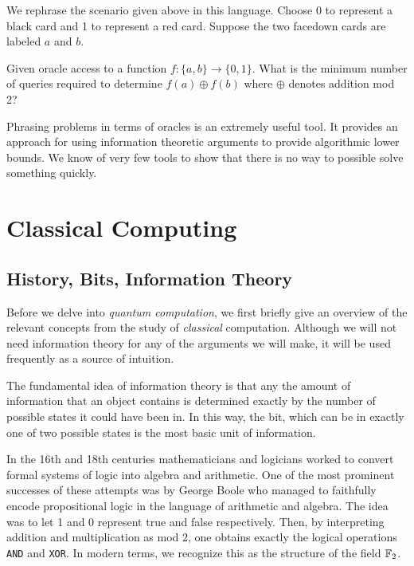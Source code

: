         We rephrase the scenario given above in this language.  Choose 0 to represent a black card and 1 to
        represent a red card. Suppose the two facedown cards are labeled $a$ and $b$.   
       
        \begin{example} 
            Given oracle access to a function $f: \{a, b\} \rightarrow \{0, 1\}$. What is the minimum number of
            queries required to determine $f(a) \oplus f(b)$ where $\oplus$ denotes addition mod 2?
        \end{example}

        

        Phrasing problems in terms of oracles is an extremely useful tool. It provides an approach for using 
        information theoretic arguments to provide algorithmic lower bounds. We know of very few tools to show that 
        there is no way to possible solve something quickly.

        \begin{example}
        \end{example}


        

\section{Classical Computing}
        \subsection{History, Bits, Information Theory}
        Before we delve into  \emph{quantum computation}, we first briefly give an overview of the relevant 
        concepts from the study of \emph{classical} computation. Although we will not need information theory for 
        any of the arguments we will make, it will be used frequently as a source of intuition.

        The fundamental idea of information theory is that any the amount of information that an object contains is 
        determined exactly by the number of possible states it could have been in. In this way, the bit, which can 
        be in exactly one of two possible states is the most basic unit of information.


        In the 16th and 18th centuries mathematicians and logicians worked to convert formal systems of logic into 
        algebra and arithmetic. One of the most prominent successes of these attempts was by George Boole who 
        managed to faithfully encode propositional logic in the language of arithmetic and algebra. The idea was to 
        let 1 and 0 represent true and false respectively. Then, by interpreting addition and multiplication as mod 
        2, one obtains exactly the logical operations \texttt{AND} and  \texttt{XOR}. In modern terms, we recognize 
        this as the structure of the field $\mathbb{F}_2$. 
        
